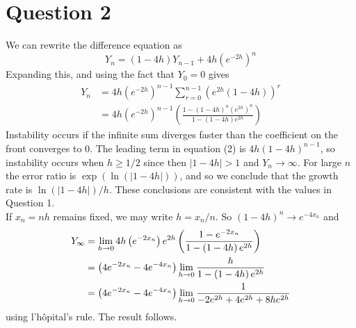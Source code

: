 \documentclass[10pt,a4paper,notitlepage]{article}
\newcommand{\abs}[1]{\lvert#1\rvert}
\begin{document}
\section*{\centering \large Question 2}
We can rewrite the difference equation as
\begin{equation}
Y_{n}=\left( 1-4h\right) Y_{n-1}+4h\left( e^{-2h}\right) ^{n}
\end{equation}
Expanding this, and using the fact that $Y_{0}=0$ gives
\begin{equation}
\begin{aligned}
Y_{n}&=4h\left(e^{-2h}\right)^{n-1}\sum_{r=0}^{n-1}\left(e^{2h}\left(1-4h\right)\right)^{r}\\
&=4h\left( e^{-2h}\right)^{n-1}\left(\frac{1-(1-4h)^{n}\left( e^{2h}\right) ^{n}}{1-\left( 1-4h\right)e^{2h}}\right)
\end{aligned}
\end{equation}
Instability occurs if the infinite sum diverges faster than the coefficient on the front converges to 0. The leading term in equation (2) is $4h(1-4h)^{n-1}$, so instability occurs when $h\geq 1/2$ since then $\abs{1-4h}>1$ and $Y_{n}\rightarrow \infty$. For large $n$ the error ratio is $\exp\left( \ln\left(\abs{1-4h}\right)\right)$, and so we conclude that the growth rate is $\ln\left(\abs{1-4h}\right)/h$. These conclusions are consistent with the values in Question 1.\\

If $x_{n}=nh$ remains fixed, we may write $h=x_{n}/n$. So $(1-4h)^{n}\rightarrow e^{-4x_{n}}$ and
\begin{equation}
\begin{aligned}
Y_{\infty}&=\lim_{h\rightarrow 0}4h\left( e^{-2x_{n}}\right) e^{2h}\left(\frac{1-e^{-2x_{n}}}{1-\left(1-4h\right)e^{2h}}\right)\\
&= \left(4e^{-2x_{n}}-4e^{-4x_{n}}\right)\lim_{h\rightarrow 0}\frac{h}{1-\left( 1-4h\right) e^{2h}}\\
&= \left( 4e^{-2 x_{n}}-4 e^{-4 x_{n}}\right) \lim _{h \rightarrow 0}\frac{1}{-2 e^{2 h}+4 e^{2 h}+8 h e^{2 h}}
\end{aligned}\\
\end{equation}
using l'hôpital's rule. The result follows.
\end{document}
